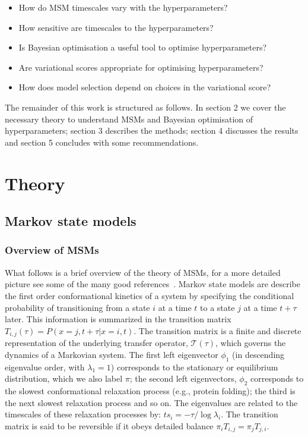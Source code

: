 \documentclass[journal=jacsat,manuscript=article]{achemso}
\begin{document}
\begin{itemize}
    \item How do MSM timescales vary with the hyperparameters? 
    \item How sensitive are timescales to the hyperparameters? 
    \item Is Bayesian optimisation a useful tool to optimise hyperparameters? 
    \item Are variational scores appropriate for optimising hyperparameters? 
    \item How does model selection depend on choices in the variational score? 
\end{itemize}


The remainder of this work is structured as follows.  In section 2 we cover the necessary theory to understand MSMs and Bayesian optimisation of hyperparameters; section 3 describes the methods; section 4 discusses the results and section 5 concludes with some recommendations. 

\section{Theory}\label{theory}
\subsection{Markov state models}
\subsubsection{Overview of MSMs}

What follows is a brief overview of the theory of MSMs, for a more detailed picture see some of the many good references~\cite{prinz_believe_2011, trendelkamp-schroer_estimation_2015}. Markov state models are describe the first order conformational kinetics of a system by specifying the conditional probability of transitioning from a state $i$ at a time $t$ to a state $j$ at a time $t+\tau$  later. This information is summarized in the transition matrix $T_{i, j}(\tau) = P(x=j, t+\tau | x=i, t)$. The transition matrix is a finite and discrete representation of the underlying transfer operator, $\mathcal{T}(\tau)$, which governs the dynamics of a Markovian system. The first left eigenvector $\phi_1$ (in descending eigenvalue order, with $\lambda_{1} = 1$) corresponds to the stationary or equilibrium distribution, which we also label $\pi$; the second left eigenvectors, $\phi_2$ corresponds to the slowest conformational relaxation process (e.g., protein folding); the third is the next slowest relaxation process and so on. The eigenvalues are related to the timescales of these relaxation processes by: $ts_{i} = -\tau/\log{\lambda_i}$.  The transition matrix is said to be reversible if it obeys detailed balance $\pi_i T_{i, j}=\pi_j T_{j, i}$. 
\end{document}

